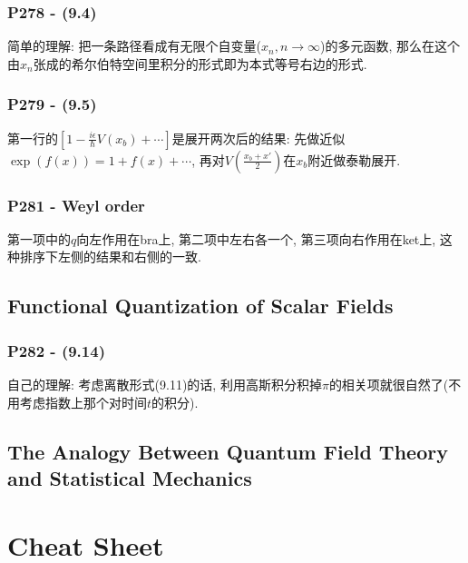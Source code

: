 \documentclass[cn,hazy,blue,11pt,device=normal,chinesefont=founder]{elegantnote}
\begin{document}
\subsubsection{P278 - (9.4)}

\begin{remark}
  简单的理解: 把一条路径看成有无限个自变量($x_n, n \rightarrow \infty$)的多元函数, 那么在这个由$x_n$张成的希尔伯特空间里积分的形式即为本式等号右边的形式. 
\end{remark}

\subsubsection{P279 - (9.5)}

第一行的$[1-\frac{i\epsilon}{\hbar}V(x_b)+\cdots]$是展开两次后的结果: 先做近似$\exp(f(x)) = 1 + f(x) + \cdots$, 再对$V(\frac{x_b + x'}{2})$在$x_b$附近做泰勒展开.  

\subsubsection{P281 - Weyl order}

第一项中的$q$向左作用在bra上, 第二项中左右各一个, 第三项向右作用在ket上, 这种排序下左侧的结果和右侧的一致. 

\subsection{Functional Quantization of Scalar Fields}

\subsubsection{P282 - (9.14)}

\begin{remark}
  自己的理解: 考虑离散形式(9.11)的话, 利用高斯积分积掉$\pi$的相关项就很自然了(不用考虑指数上那个对时间$t$的积分). 
\end{remark}

\subsection{The Analogy Between Quantum Field Theory and Statistical Mechanics}


\clearpage

\section{Cheat Sheet}
\end{document}
